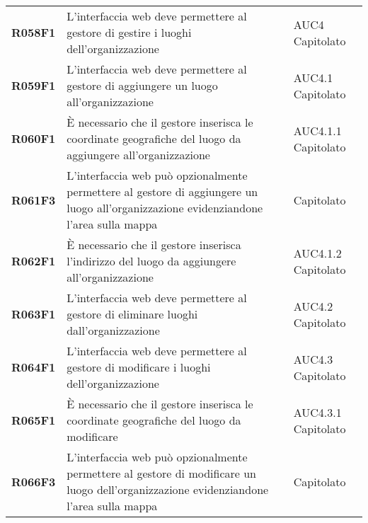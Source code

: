 \documentclass[../analisi-dei-requisiti.tex]{subfiles}
\begin{document}
\begin{center}
\begin{longtable}[H]{>{\centering\bfseries}m{3cm} >{\centering}m{10cm} >{\centering\arraybackslash}m{3cm}}
  R058F1                               & L'interfaccia web deve permettere al gestore di gestire i luoghi dell'organizzazione                                                                                                                    & AUC4 Capitolato               \\
  R059F1                               & L'interfaccia web deve permettere al gestore di aggiungere un luogo all'organizzazione                                                                                                                  & AUC4.1 Capitolato             \\
  R060F1                               & È necessario che il gestore inserisca le coordinate geografiche del luogo da aggiungere all'organizzazione                                                                                              & AUC4.1.1 Capitolato           \\
  R061F3                               & L'interfaccia web può opzionalmente permettere al gestore di aggiungere un luogo all'organizzazione evidenziandone l'area sulla mappa                                                                   & Capitolato                    \\
  R062F1                               & È necessario che il gestore inserisca l'indirizzo del luogo da aggiungere all'organizzazione                                                                                                            & AUC4.1.2 Capitolato           \\
  R063F1                               & L'interfaccia web deve permettere al gestore di eliminare luoghi dall'organizzazione                                                                                                                    & AUC4.2 Capitolato             \\
  R064F1                               & L'interfaccia web deve permettere al gestore di modificare i luoghi dell'organizzazione                                                                                                                 & AUC4.3 Capitolato             \\
  R065F1                               & È necessario che il gestore inserisca le coordinate geografiche del luogo da modificare                                                                                                                 & AUC4.3.1 Capitolato           \\
  R066F3                               & L'interfaccia web può opzionalmente permettere al gestore di modificare un luogo dell'organizzazione evidenziandone l'area sulla mappa                                                                  & Capitolato                    \\

\end{longtable}
\end{center}
\end{document}

